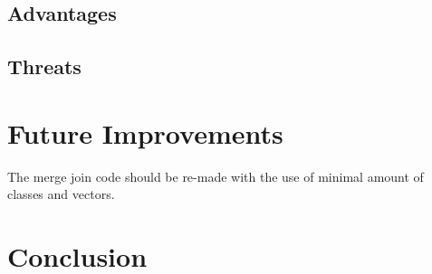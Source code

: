 \documentclass[conference, 11pt]{IEEEtran}
\begin{document}
	\subsection{Advantages}
	
	\subsection{Threats}
	
	
\section{Future Improvements}
The merge join code should be re-made with the use of minimal amount of classes and vectors.

\section{Conclusion}



\end{document}

